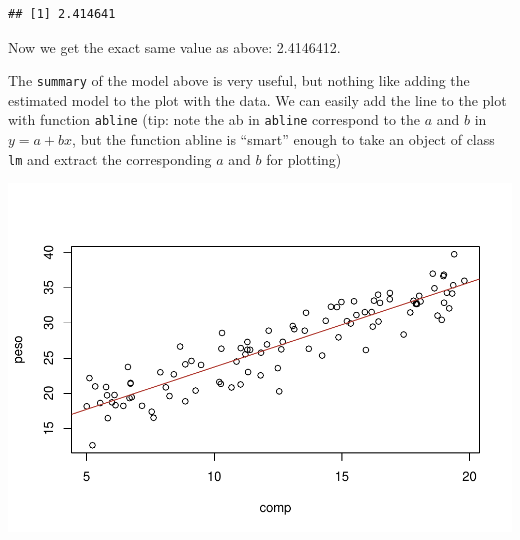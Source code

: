 \documentclass[
]{book}
\newenvironment{Shaded}{\begin{snugshade}}{\end{snugshade}}
\newcommand{\AttributeTok}[1]{\textcolor[rgb]{0.13,0.29,0.53}{#1}}
\newcommand{\CommentTok}[1]{\textcolor[rgb]{0.56,0.35,0.01}{\textit{#1}}}
\newcommand{\DecValTok}[1]{\textcolor[rgb]{0.00,0.00,0.81}{#1}}
\newcommand{\FloatTok}[1]{\textcolor[rgb]{0.00,0.00,0.81}{#1}}
\newcommand{\FunctionTok}[1]{\textcolor[rgb]{0.13,0.29,0.53}{\textbf{#1}}}
\newcommand{\NormalTok}[1]{#1}
\newcommand{\SpecialCharTok}[1]{\textcolor[rgb]{0.81,0.36,0.00}{\textbf{#1}}}
\newcommand{\StringTok}[1]{\textcolor[rgb]{0.31,0.60,0.02}{#1}}
\begin{document}
\begin{verbatim}
## [1] 2.414641
\end{verbatim}

Now we get the exact same value as above: 2.4146412.

The \texttt{summary} of the model above is very useful, but nothing like adding the estimated model to the plot with the data. We can easily add the line to the plot with function \texttt{abline} (tip: note the ab in \texttt{abline} correspond to the \(a\) and \(b\) in \(y=a+bx\), but the function abline is ``smart'' enough to take an object of class \texttt{lm} and extract the corresponding \(a\) and \(b\) for plotting)

\begin{Shaded}
\end{Shaded}

\includegraphics{ECOMODbook_files/figure-latex/a6.9-1.pdf}
\end{document}
